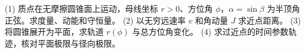 (1) 质点在无摩擦圆锥面上运动，母线坐标 \(r>0\)、方位角 \(\phi\)，\(\alpha=\sin\beta\) 为半顶角正弦。求度量、动能和守恒量。
(2) 以无穷远速率 \(v\) 和角动量 \(J\) 求近点距离。
(3) 将圆锥展开为平面，求轨道 \(r(\phi)\) 与总方位角变化。
(4) 求过近点的时间参数轨迹，核对平面极限与径向极限。
